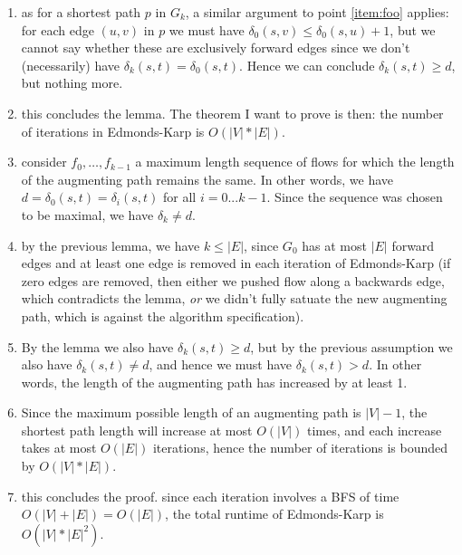 \begin{enumerate}
  \item as for a shortest path $p$ in $G_k$, a similar argument to point
    \ref{item:foo} applies: for each edge $(u, v)$ in $p$ we must have
    $\delta_0(s, v) \leq \delta_0(s, u) + 1$, but we cannot say whether these
    are exclusively forward edges since we don't (necessarily) have $\delta_k(s,
    t) = \delta_0(s, t)$. Hence we can conclude $\delta_k(s, t) \geq d$, but
    nothing more.

  \item this concludes the lemma. The theorem I want to prove is then: the
    number of iterations in Edmonds-Karp is $O(|V| * |E|)$.

  \item consider $f_0, \dots, f_{k - 1}$ a maximum length sequence of flows for which
    the length of the augmenting path remains the same. In other words, we have
    $d = \delta_0(s, t) = \delta_i(s, t)$ for all $i = 0...k - 1$. Since the
    sequence was chosen to be maximal, we have $\delta_k \neq d$.

  \item by the previous lemma, we have $k \leq |E|$, since $G_0$ has at most
    $|E|$ forward edges and at least one edge is removed in each iteration of
    Edmonds-Karp (if zero edges are removed, then either we pushed flow along a
    backwards edge, which contradicts the lemma, \emph{or} we didn't fully
    satuate the new augmenting path, which is against the algorithm
    specification).

  \item By the lemma we also have $\delta_k(s, t) \geq d$, but by the previous
    assumption we also have $\delta_k(s, t) \neq d$, and hence we must have
    $\delta_k(s, t) > d$. In other words, the length of the augmenting path has
    increased by at least 1.

  \item Since the maximum possible length of an augmenting path is $|V| - 1$,
    the shortest path length will increase at most $O(|V|)$ times, and each
    increase takes at most $O(|E|)$ iterations, hence the number of iterations
    is bounded by $O(|V| * |E|)$.

  \item this concludes the proof. since each iteration involves a BFS of time
    $O(|V| + |E|) = O(|E|)$, the total runtime of Edmonds-Karp is $O(|V| *
    |E|^2)$.

\end{enumerate}

